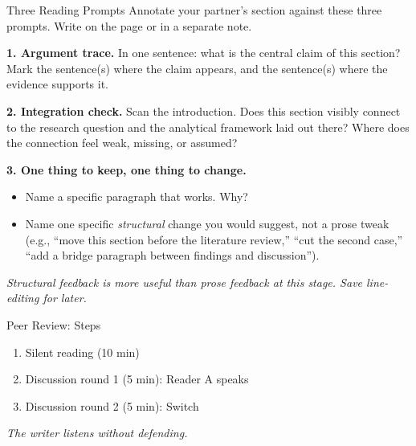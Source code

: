 \documentclass[aspectratio=169,11pt]{beamer}
\begin{document}
\begin{frame}{Three Reading Prompts}
    \footnotesize
    Annotate your partner's section against these three prompts. Write on the page or in a separate note.
    \vspace{0.15cm}

    \textbf{1. Argument trace.} In one sentence: what is the central claim of this section? Mark the sentence(s) where the claim appears, and the sentence(s) where the evidence supports it.
    \vspace{0.1cm}

    \textbf{2. Integration check.} Scan the introduction. Does this section visibly connect to the research question and the analytical framework laid out there? Where does the connection feel weak, missing, or assumed?
    \vspace{0.1cm}

    \textbf{3. One thing to keep, one thing to change.}
    \begin{itemize}
        \item Name a specific paragraph that works. Why?
        \item Name one specific \textit{structural} change you would suggest, not a prose tweak (e.g., ``move this section before the literature review,'' ``cut the second case,'' ``add a bridge paragraph between findings and discussion'').
    \end{itemize}
    \vspace{0.2cm}
    \textit{Structural feedback is more useful than prose feedback at this stage. Save line-editing for later.}
\end{frame}

\begin{frame}{Peer Review: Steps}
    \Large
    \vspace{0.4cm}
    \begin{enumerate}
        \setlength{\itemsep}{0.5cm}
        \item Silent reading (10 min)
        \item Discussion round 1 (5 min): Reader A speaks
        \item Discussion round 2 (5 min): Switch
    \end{enumerate}
    \vspace{0.6cm}
    \begin{center}
        \large \itshape The writer listens without defending.
    \end{center}
\end{frame}
\end{document}
